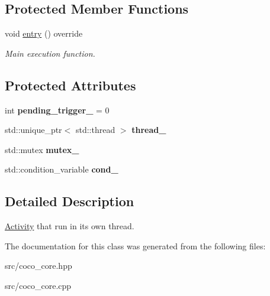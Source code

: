 \subsection*{Protected Member Functions}
\begin{DoxyCompactItemize}
\item 
\hypertarget{classcoco_1_1_parallel_activity_a320a783acbe011c53fed23747336e713}{}void \hyperlink{classcoco_1_1_parallel_activity_a320a783acbe011c53fed23747336e713}{entry} () override\label{classcoco_1_1_parallel_activity_a320a783acbe011c53fed23747336e713}

\begin{DoxyCompactList}\small\item\em Main execution function. \end{DoxyCompactList}\end{DoxyCompactItemize}
\subsection*{Protected Attributes}
\begin{DoxyCompactItemize}
\item 
\hypertarget{classcoco_1_1_parallel_activity_a224d3ef52fe174f3b1961d5619c4ff82}{}int {\bfseries pending\+\_\+trigger\+\_\+} = 0\label{classcoco_1_1_parallel_activity_a224d3ef52fe174f3b1961d5619c4ff82}

\item 
\hypertarget{classcoco_1_1_parallel_activity_ae874a1d7b5a96573d823f559fb536952}{}std\+::unique\+\_\+ptr$<$ std\+::thread $>$ {\bfseries thread\+\_\+}\label{classcoco_1_1_parallel_activity_ae874a1d7b5a96573d823f559fb536952}

\item 
\hypertarget{classcoco_1_1_parallel_activity_a6c64edb3104389d3dcf41a9e87fc4c2f}{}std\+::mutex {\bfseries mutex\+\_\+}\label{classcoco_1_1_parallel_activity_a6c64edb3104389d3dcf41a9e87fc4c2f}

\item 
\hypertarget{classcoco_1_1_parallel_activity_a1dcd65a0e7e115c3deebdebd2e8646a1}{}std\+::condition\+\_\+variable {\bfseries cond\+\_\+}\label{classcoco_1_1_parallel_activity_a1dcd65a0e7e115c3deebdebd2e8646a1}

\end{DoxyCompactItemize}


\subsection{Detailed Description}
\hyperlink{classcoco_1_1_activity}{Activity} that run in its own thread. 

The documentation for this class was generated from the following files\+:\begin{DoxyCompactItemize}
\item 
src/coco\+\_\+core.\+hpp\item 
src/coco\+\_\+core.\+cpp\end{DoxyCompactItemize}
